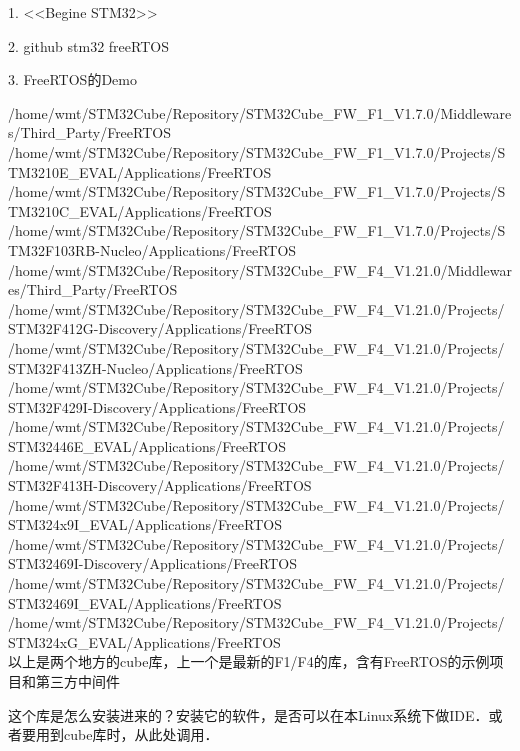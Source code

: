 \documentclass[utf8]{ctexart}
\begin{document}
1. <<Begine STM32>>

2. github stm32 freeRTOS

3. FreeRTOS的Demo


/home/wmt/STM32Cube/Repository/STM32Cube_FW_F1_V1.7.0/Middlewares/Third_Party/FreeRTOS \\
/home/wmt/STM32Cube/Repository/STM32Cube_FW_F1_V1.7.0/Projects/STM3210E_EVAL/Applications/FreeRTOS \\
/home/wmt/STM32Cube/Repository/STM32Cube_FW_F1_V1.7.0/Projects/STM3210C_EVAL/Applications/FreeRTOS  \\
/home/wmt/STM32Cube/Repository/STM32Cube_FW_F1_V1.7.0/Projects/STM32F103RB-Nucleo/Applications/FreeRTOS  \\
/home/wmt/STM32Cube/Repository/STM32Cube_FW_F4_V1.21.0/Middlewares/Third_Party/FreeRTOS \\
/home/wmt/STM32Cube/Repository/STM32Cube_FW_F4_V1.21.0/Projects/STM32F412G-Discovery/Applications/FreeRTOS \\
/home/wmt/STM32Cube/Repository/STM32Cube_FW_F4_V1.21.0/Projects/STM32F413ZH-Nucleo/Applications/FreeRTOS \\
/home/wmt/STM32Cube/Repository/STM32Cube_FW_F4_V1.21.0/Projects/STM32F429I-Discovery/Applications/FreeRTOS \\
/home/wmt/STM32Cube/Repository/STM32Cube_FW_F4_V1.21.0/Projects/STM32446E_EVAL/Applications/FreeRTOS \\
/home/wmt/STM32Cube/Repository/STM32Cube_FW_F4_V1.21.0/Projects/STM32F413H-Discovery/Applications/FreeRTOS \\
/home/wmt/STM32Cube/Repository/STM32Cube_FW_F4_V1.21.0/Projects/STM324x9I_EVAL/Applications/FreeRTOS \\
/home/wmt/STM32Cube/Repository/STM32Cube_FW_F4_V1.21.0/Projects/STM32469I-Discovery/Applications/FreeRTOS \\
/home/wmt/STM32Cube/Repository/STM32Cube_FW_F4_V1.21.0/Projects/STM32469I_EVAL/Applications/FreeRTOS \\
/home/wmt/STM32Cube/Repository/STM32Cube_FW_F4_V1.21.0/Projects/STM324xG_EVAL/Applications/FreeRTOS \\

以上是两个地方的cube库，上一个是最新的F1/F4的库，含有FreeRTOS的示例项目和第三方中间件

这个库是怎么安装进来的？安装它的软件，是否可以在本Linux系统下做IDE．或者要用到cube库时，从此处调用．
\end{document}
